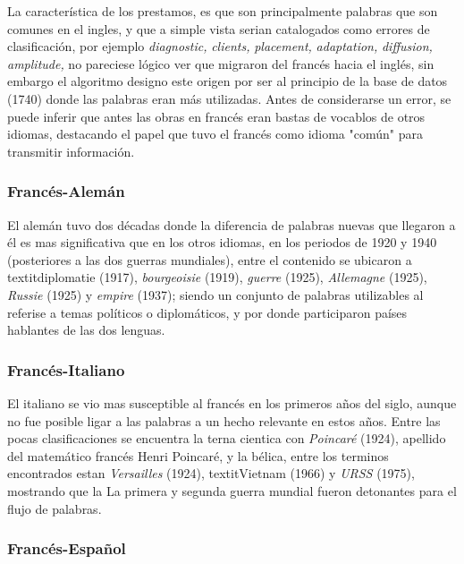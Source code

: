 La característica de los prestamos, es que son principalmente palabras que son comunes en el ingles, y que a simple vista serian catalogados como errores de clasificación, por ejemplo  \textit{diagnostic,} \textit{clients,} \textit{placement,} \textit{adaptation,} \textit{diffusion,} \textit{amplitude,} no pareciese lógico ver que migraron del francés hacia el inglés, sin embargo el algoritmo designo este origen por ser al principio de la base de datos (1740)  donde las palabras eran más utilizadas.  Antes de considerarse un error, se puede inferir que antes las obras en francés eran bastas de vocablos de otros idiomas, destacando el papel que tuvo el francés como idioma "común" para transmitir información. 


\subsubsection*{Francés-Alemán}%

El alemán tuvo dos décadas donde la diferencia de palabras nuevas que llegaron a él es mas significativa que en los otros idiomas, en los periodos de 1920 y 1940  (posteriores a las dos guerras mundiales), entre el contenido se ubicaron a  textit{diplomatie} (1917), \textit{bourgeoisie} (1919),  \textit{guerre} (1925), \textit{Allemagne} (1925), \textit{Russie} (1925) y \textit{empire} (1937); siendo un conjunto de palabras utilizables al referise a temas políticos  o diplomáticos, y por donde participaron países hablantes de las dos lenguas. 


\subsubsection*{Francés-Italiano}%

El italiano se vio mas susceptible al francés en los primeros años del siglo, aunque no fue posible ligar a las palabras a un hecho relevante en estos años. Entre las pocas clasificaciones se encuentra la terna cientica con \textit{Poincaré} (1924), apellido del matemático francés Henri Poincaré, y la bélica,  entre los terminos encontrados estan \textit{Versailles} (1924), textit{Vietnam} (1966)  y \textit{URSS} (1975), mostrando que la  La primera y segunda guerra mundial fueron detonantes para el flujo de palabras.


\subsubsection*{Francés-Español}%


